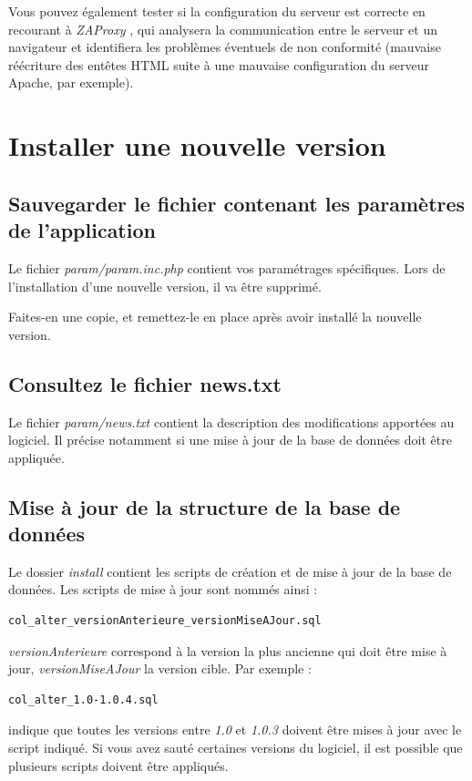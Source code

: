 Vous pouvez également tester si la configuration du serveur est correcte en recourant à \textit{ZAProxy} \cite{zaproxy}, qui analysera la communication entre le serveur et un navigateur et identifiera les problèmes éventuels de non conformité (mauvaise réécriture des entêtes HTML suite à une mauvaise configuration du serveur Apache, par exemple).

\section{Installer une nouvelle version}
\label{newVersion}

\subsection{Sauvegarder le fichier contenant les paramètres de l'application}

Le fichier \textit{param/param.inc.php} contient vos paramétrages spécifiques. Lors de l'installation d'une nouvelle version, il va être supprimé.

Faites-en une copie, et remettez-le en place après avoir installé la nouvelle version.

\subsection{Consultez le fichier news.txt}

Le fichier \textit{param/news.txt} contient la description des modifications apportées au logiciel. Il précise notamment si une mise à jour de la base de données doit être appliquée.

\subsection{Mise à jour de la structure de la base de données}

Le dossier \textit{install} contient les scripts de création et de mise à jour de la base de données. Les scripts de mise à jour sont nommés ainsi :
\begin{lstlisting}
col_alter_versionAnterieure_versionMiseAJour.sql
\end{lstlisting}

\textit{versionAnterieure} correspond à la version la plus ancienne qui doit être mise à jour, \textit{versionMiseAJour} la version cible. Par exemple :
\begin{lstlisting}
col_alter_1.0-1.0.4.sql
\end{lstlisting}
indique que toutes les versions entre \textit{1.0} et \textit{1.0.3} doivent être mises à jour avec le script indiqué. Si vous avez \og sauté \fg{} certaines versions du logiciel, il est possible que plusieurs scripts doivent être appliqués.

